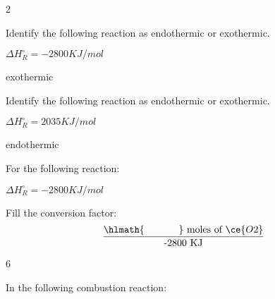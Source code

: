 \documentclass[main.tex]{subfiles}
\begin{document}
\begin{multicols*}{2}
\begin{question}[ID=\the\value{numA}]
Identify the following reaction as endothermic or exothermic.
 \begin{center} \hspace*{0pt}\hfill $\Delta H^{\circ}_R=	 -2800KJ/mol$\end{center}
\end{question}
\begin{solution}
exothermic
 \hspace{0.1cm}\end{solution}
\begin{question}[ID=\the\value{numA}]
Identify the following reaction as endothermic or exothermic.
 \begin{center} \hspace*{0pt}\hfill $\Delta H^{\circ}_R=	   2035KJ/mol$\end{center}
\end{question}
\begin{solution}
endothermic
 \hspace{0.1cm}\end{solution}
\begin{question}[ID=\the\value{numA}]
For the following reaction:
 \begin{center} \hspace*{0pt}\hfill $\Delta H^{\circ}_R=	   -2800KJ/mol$\end{center}
Fill the conversion factor:
\begin{equation*}
\frac{\hlmath{\hspace{35pt}}\text{ moles of }\ce{O2}}{\text{ -2800 KJ }} 
\end{equation*}
\end{question}
\begin{solution}
6
 \hspace{0.1cm}\end{solution}
\begin{question}[ID=\the\value{numA}]
In the following combustion reaction:

\end{question}
\end{multicols*}
\end{document}
